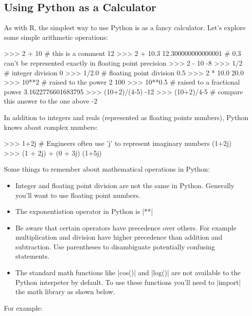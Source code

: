\subsection{Using Python as a Calculator}

As with R, the simplest way to use Python is as a fancy calculator.
Let's explore some simple arithmetic operations:
%
\begin{python}
>>> 2 + 10   # this is a comment
12
>>> 2 + 10.3
 12.300000000000001  # 0.3 can't be represented exactly in floating point precision
>>> 2 - 10
-8
>>> 1/2  # integer division
0
>>> 1/2.0  # floating point division
0.5
>>> 2 * 10.0
20.0
>>> 10**2  # raised to the power 2
100
>>> 10**0.5  # raised to a fractional power
3.1622776601683795
>>> (10+2)/(4-5)
-12
>>> (10+2)/4-5  # compare this answer to the one above 
-2
\end{python}
%
In addition to integers and reals (represented as floating points
numbers), Python knows about complex numbers:
%
\begin{python}
>>> 1+2j    # Engineers often use 'j' to represent imaginary numbers
(1+2j)
>>> (1 + 2j) + (0 + 3j)
(1+5j)
\end{python}

Some things to remember about mathematical operations in Python:
\begin{itemize}
\item
  Integer and floating point division are not the same in Python.
  Generally you'll want to use floating point numbers.
\item
  The exponentiation operator in Python is |**|
\item
  Be aware that certain operators have precedence over others. For
  example multiplication and division have higher precedence than
  addition and subtraction. Use parentheses to disambiguate potentially
  confusing statements.
\item
  The standard math functions like |cos()| and
  |log()| are not available to the Python interpeter by
  default. To use these functions you'll need to |import| the
  math library as shown below.
\end{itemize}

For example:
%


